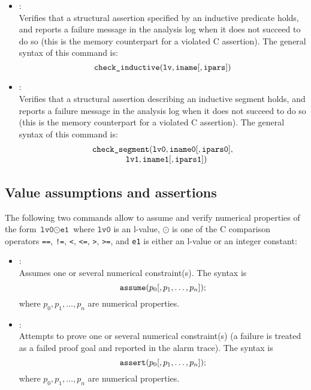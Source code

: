 \begin{itemize}
\item[\dcommand{check\textunderscore inductive}]: \\
  Verifies that a structural assertion specified by an inductive predicate
  holds, and reports a failure message in the analysis log when it does
  not succeed to do so (this is the memory counterpart for a violated C
  assertion).
  The general syntax of this command is:
  \[
  \texttt{check\_inductive}( \texttt{lv}, \texttt{iname} [, \texttt{ipars}] )
  \]
\item[\dcommand{check\textunderscore segment}]: \\
  Verifies that a structural assertion describing an inductive segment
  holds, and reports a failure message in the analysis log when it does
  not succeed to do so (this is the memory counterpart for a violated C
  assertion).
  The general syntax of this command is:
  \[
  \begin{array}{l}
    \texttt{check\_segment}( \texttt{lv0}, \texttt{iname0}
    [, \texttt{ipars0}], \\
    \qquad \qquad \texttt{lv1}, \texttt{iname1} [, \texttt{ipars1}] )
  \end{array}
  \]
\end{itemize}

\subsection{Value assumptions and assertions}
The following two commands allow to assume and verify numerical
properties of the form \( \texttt{lv0} \mathrel{\odot} \texttt{e1} \)
where \( \texttt{lv0} \) is an l-value, \( \odot \) is one of the C
comparison operators \texttt{==}, \texttt{!=}, \texttt{<}, \texttt{<=},
\texttt{>}, \texttt{>=}, and \texttt{e1} is either an l-value or an
integer constant:
\begin{itemize}
\item[\dcommand{assume}]: \\
  Assumes one or several numerical constraint(s).
  The syntax is
  \[
  \texttt{assume}( p_0 [, p_1, \ldots, p_n ] );
  \]
  where \( p_0, p_1, \ldots, p_n \) are numerical properties.
\item[\dcommand{assert}]: \\
  Attempts to prove one or several numerical constraint(s)
  (a failure is treated as a failed proof goal and reported in the
  alarm trace).
  The syntax is
  \[
  \texttt{assert}( p_0 [, p_1, \ldots, p_n ] );
  \]
  where \( p_0, p_1, \ldots, p_n \) are numerical properties.
\end{itemize}

